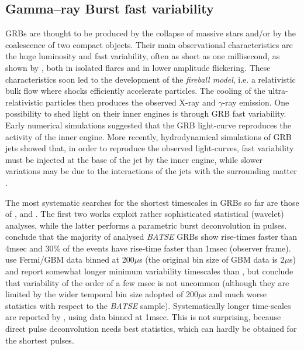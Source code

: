 \documentclass[]{spie}  %
\begin{document}
\subsection{Gamma--ray Burst fast variability}
 
GRBs are thought to be produced by the collapse of massive stars
and/or by the coalescence of two compact objects. Their main
observational characteristics are the huge luminosity and fast
variability, often as short as one millisecond, as shown by 
\citet{Walker00}, both in isolated flares and in lower amplitude
flickering. These characteristics soon led to the development of the
{\it fireball model}, i.e. a relativistic bulk flow where shocks
efficiently accelerate particles. The cooling of the
ultra-relativistic particles then produces the observed X-ray and
$\gamma$-ray emission. One possibility to shed light on their inner 
engines is through GRB fast variability.  Early numerical simulations 
\citep{Kobayashi97,Ramirez00,Spada00} suggested that the GRB light-curve 
reproduces the activity of the inner engine. More recently, hydrodynamical simulations of GRB jets showed that, in order to reproduce the 
observed light-curves, fast variability must be injected at the base of 
the jet by the inner engine, while slower variations may be due to the 
interactions of the jets with the surrounding matter \citep{Morsony10}.
 
The most systematic searches for the shortest timescales in GRBs so
far are those of \citet{Walker00}, \citet{MacLachlan13} and
\citet{Bhat12}. The first two works exploit rather sophisticated
statistical (wavelet) analyses, while the latter performs a parametric
burst deconvolution in pulses. \citet{Walker00} conclude that the 
majority of analysed {\it BATSE} GRBs show rise-times faster than 4msec and 
30\% of the events have rise-time faster than 1msec (observer frame).  
\citet{MacLachlan13} use Fermi/GBM data binned at 200$\mu$s (the original 
bin size of GBM data is 2$\mu$s) and report somewhat longer minimum 
variability timescales than \citet{Walker00}, but conclude that variability 
of the order of a few msec is not uncommon (although they are limited by 
the wider temporal bin size adopted of 200$\mu$s and much worse statistics 
with respect to the {\it BATSE} sample).  Systematically longer time-scales are reported 
by \citet{Bhat12}, using data binned at 1msec. This is not surprising, 
because direct pulse deconvolution needs best statistics, which can hardly 
be obtained for the shortest pulses. 
\end{document}
